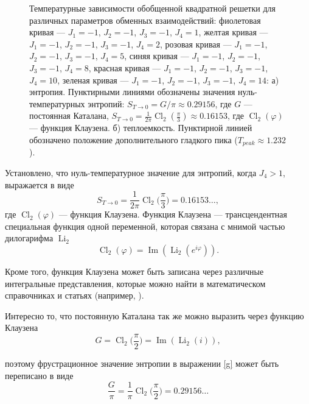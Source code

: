 \documentclass[utf8,12pt]{jetp}
\DeclareMathOperator{\Cl}{Cl}
\DeclareMathOperator{\Li}{Li}
\DeclareMathOperator{\im}{Im}
\begin{document}
\begin{figure}[h]
\begin{minipage}[h]{0.5\linewidth}
	\end{minipage}
	\caption{Температурные зависимости обобщенной квадратной решетки для различных параметров обменных взаимодействий: фиолетовая кривая --- $J_1 = -1$, $J_2 = -1$, $J_3 = -1$, $J_4 = 1$, желтая кривая --- $J_1 = -1$, $J_2 = -1$, $J_3 = -1$, $J_4 = 2$, розовая кривая --- $J_1 = -1$, $J_2 = -1$, $J_3 = -1$, $J_4 = 5$, синяя кривая --- $J_1 = -1$, $J_2 = -1$, $J_3 = -1$, $J_4 = 8$, красная кривая --- $J_1 = -1$, $J_2 = -1$, $J_3 = -1$, $J_4 = 10$, зеленая кривая --- $J_1 = -1$, $J_2 = -1$, $J_3 = -1$, $J_4 = 14$: а) энтропия. Пунктирными линиями обозначены значения нуль-температурных энтропий: $S_{T\rightarrow 0} = G/\pi\approx 0.29156$, где $G$ --- постоянная Каталана, $S_{T\rightarrow 0} = \frac{1}{2\pi} \Cl_2 (\frac{\pi}{3})\approx0.16153$, где $\Cl_2 (\varphi)$ --- функция Клаузена. б) теплоемкость. Пунктирной линией обозначено положение дополнительного гладкого пика ($T_{peak}\approx1.232$).}
	\label{Peak}
\end{figure}

Установлено, что нуль-температурное значение для энтропий, когда $J_4>1$, выражается в виде    
\begin{equation}
S_{T\rightarrow 0} = \frac{1}{2\pi} \Cl_2 \bigg(\frac{\pi}{3}\bigg)   = 0.16153\dots, 
\label{cl}
\end{equation} 
где  $\Cl_2 (\varphi)$ --- функция Клаузена. Функция Клаузена --- трансцендентная специальная функция одной переменной, которая связана с мнимой частью дилогарифма $\Li_2$
\begin{equation*}
\Cl_2 (\varphi) = \im (\Li_2 (e^{i \varphi})).
\end{equation*}

Кроме того, функция Клаузена может быть записана через различные интегральные представления, которые можно найти в математическом справочниках и статьях (например, \cite{abramowitz_stegun1972, wood1968}).

Интересно то, что постоянную Каталана так же можно выразить через функцию Клаузена~\cite{wood1968}
\begin{equation*}
G = \Cl_2 \bigg(\frac{\pi}{2}\bigg) = \im (\Li_2 (i)),
\end{equation*}

\noindent поэтому фрустрационное значение энтропии в выражении \eqref{g} может быть переписано в виде
\begin{equation}
\frac{G}{\pi} = \frac{1}{\pi} \Cl_2 \bigg(\frac{\pi}{2}\bigg) = 0.29156\dots
\end{equation}
\end{document}
